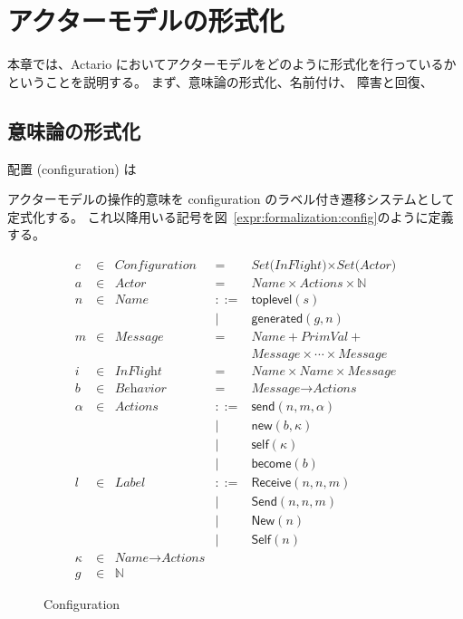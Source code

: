 \chapter{アクターモデルの形式化}
\label{chapter:formalization}

本章では、Actario においてアクターモデルをどのように形式化を行っているかということを説明する。
まず、意味論の形式化、名前付け、
障害と回復、

\section{意味論の形式化}

配置 (configuration) は

アクターモデルの操作的意味を configuration のラベル付き遷移システムとして定式化する。
これ以降用いる記号を図~\ref{expr:formalization:config}のように定義する。

\begin{figure}[t]
  \begin{displaymath}
    \begin{array}{rclcl}
      c & \in & \textit{Configuration} & =   & \textit{Set(InFlight)} \times \textit{Set(Actor)} \\
      a & \in & \textit{Actor}  & =   & \textit{Name} \times \textit{Actions} \times \mathbb{N} \\
      n & \in & \textit{Name}   & ::= & \textsf{toplevel}(s) \\
        &     &                 &   | & \textsf{generated}(g, n) \\
      m & \in & \textit{Message} & =  & \textit{Name} + \textit{PrimVal} + \\
        &     &                 &     & \textit{Message} \times \cdots \times \textit{Message} \\
      i & \in & \textit{InFlight} & = & \textit{Name} \times \textit{Name} \times \textit{Message} \\
      b & \in & \textit{Behavior} & = & \textit{Message} \rightarrow \textit{Actions} \\
      \alpha & \in & \textit{Actions} & ::= & \textsf{send}(n, m, \alpha) \\
        &     &                 &   | & \textsf{new}(b, \kappa) \\
        &     &                 &   | & \textsf{self}(\kappa) \\
        &     &                 &   | & \textsf{become}(b) \\
      l & \in & \textit{Label}  & ::= & \textsf{Receive}(n, n, m) \\
        &     &                 &   | & \textsf{Send}(n, n, m) \\
        &     &                 &   | & \textsf{New}(n) \\
        &     &                 &   | & \textsf{Self}(n) \\
      \kappa & \in & \textit{Name} \rightarrow \textit{Actions} \\
      g & \in & \mathbb{N} & &
    \end{array}
  \end{displaymath}
  \caption{Configuration}\label{expr:}
\end{figure}


